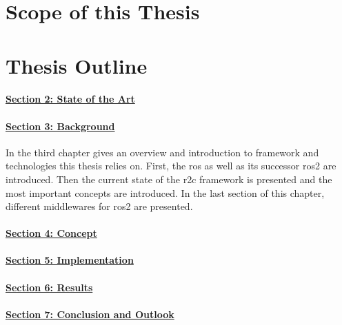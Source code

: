 \section{Scope of this Thesis}

\section{Thesis Outline}
\paragraph{\hyperref[sec:state_of_the_art]{Section 2: State of the Art}}
\paragraph{\hyperref[sec:background]{Section 3: Background}}
In the third chapter gives an overview and introduction to framework and technologies this thesis relies on. First, the \gls{ros} as well as its successor \gls{ros2} are introduced. Then the current state of the \gls{r2c} framework is presented and the most important concepts are introduced. In the last section of this chapter, different middlewares for \gls{ros2} are presented.
\paragraph{\hyperref[sec:concept]{Section 4: Concept}}
\paragraph{\hyperref[sec:implementation]{Section 5: Implementation}}
\paragraph{\hyperref[sec:results]{Section 6: Results}}
\paragraph{\hyperref[sec:conclusion_and_outlook]{Section 7: Conclusion and Outlook}}